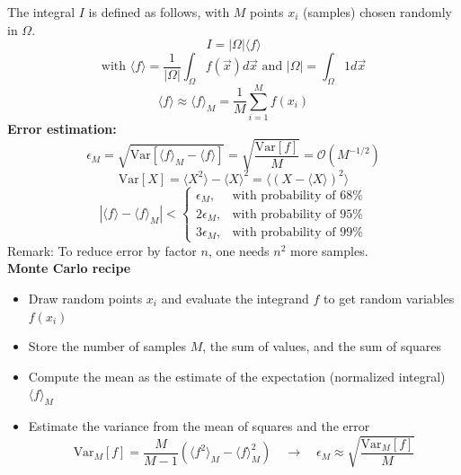 \documentclass[8pt,a4paper]{scrartcl}
\renewcommand{\compaq}{\setlength{\itemsep}{0mm}\setlength{\parskip}{0cm}}
\begin{document}
\begin{multicols*}{3}
The integral $I$ is defined as follows, with $M$ points $x_i$ (samples) chosen randomly in $\Omega$.
\begin{equation*}
I = | \Omega | \langle f \rangle
\end{equation*}
\begin{equation*}
\text{with } \langle f \rangle = \frac{1}{| \Omega |} \int_{\Omega} f( \vec x) d\vec x \text{ and }  | \Omega | = \int_{\Omega} 1 d \vec x
\end{equation*}
\begin{equation*}
\langle f \rangle \approx \langle f \rangle_M = \frac{1}{M} \sum_{i=1}^{M} f(x_i)
\end{equation*}
\textbf{Error estimation:} 
\begin{equation*}
\epsilon_M = \sqrt{\text{Var}[ \langle f \rangle_M - \langle f \rangle]} = \sqrt{\frac{\text{Var}[f]}{M}} = \mathcal{O}(M^{-1/2})
\end{equation*}
\begin{equation*}
\text{Var}[X] = \langle X^2 \rangle - \langle X \rangle^2 = \langle ( X- \langle X \rangle )^2 \rangle
\end{equation*}
\begin{equation*}
| \langle f \rangle - \langle f \rangle_M | < 
\begin{cases}
\epsilon_M, & \text{with probability of } 68\% \\
2\epsilon_M, & \text{with probability of } 95\% \\
3\epsilon_M, & \text{with probability of } 99\% 
\end{cases}
\end{equation*}
Remark: To reduce error by factor $n$, one needs $n^2$ more samples.\\

\textbf{Monte Carlo recipe}

\begin{itemize}\compaq
\item Draw random points $x_i$ and evaluate the integrand $f$ to get random variables $f(x_i)$
\item Store the number of samples $M$, the sum of values, and the sum of squares
\item Compute the mean as the estimate of the expectation (normalized integral) $\langle f \rangle_M$
\item Estimate the variance from the mean of squares and the error
\begin{equation*}
\text{Var}_M[f] = \frac{M}{M-1} \left( \langle f^2 \rangle_M - \langle f \rangle_M^2 \right) \quad \rightarrow \quad \epsilon_M \approx \sqrt{\frac{\text{Var}_M [f]}{M}}
\end{equation*}
\end{itemize}



\end{multicols*}
\end{document}
